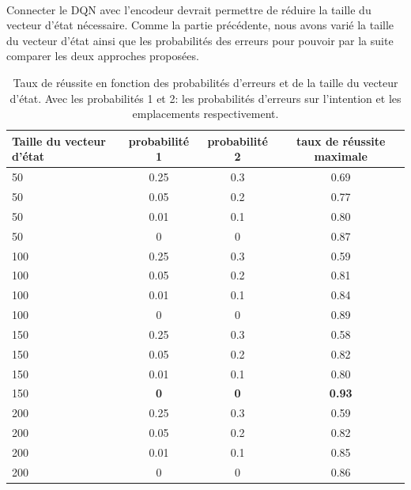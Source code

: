 \paragraph{}Connecter le DQN avec l'encodeur devrait permettre de réduire la taille du vecteur d'état nécessaire. Comme la partie précédente, nous avons varié la taille du vecteur d'état ainsi que les probabilités des erreurs pour pouvoir par la suite comparer les deux approches proposées. 
\begin{table}[H]
	\begin{center}
		
		\begin{tabular}{|l|c|c|c|}
			\hline
			\textbf{Taille du vecteur d'état} & \textbf{probabilité 1} & \textbf{probabilité 2} & \textbf{taux de réussite maximale}\\
			\hline
			50 & 0.25 & 0.3 & 0.69\\
			\hline
			50 & 0.05 & 0.2 & 0.77\\
			\hline
			50 & 0.01 & 0.1 & 0.80\\
			\hline
			50 & 0 & 0 & 0.87\\
			\hline
			100 & 0.25 & 0.3 & 0.59\\
			\hline
			100 & 0.05 & 0.2 & 0.81\\
			\hline
			100 & 0.01 & 0.1 & 0.84\\
			\hline
			100 & 0 & 0 & 0.89\\
			\hline
			150 & 0.25 & 0.3 & 0.58\\
			\hline
			150 & 0.05 & 0.2 & 0.82\\
			\hline
			150 & 0.01 & 0.1 & 0.80\\
			\hline
			150 & \textbf{0} & \textbf{0} & \textbf{0.93}\\
			\hline
			200 & 0.25 & 0.3 & 0.59\\
			\hline
			200 & 0.05 & 0.2 & 0.82\\
			\hline
			\rowcolor{LightCyan}
			200 & 0.01 & 0.1 & 0.85\\
			\hline
			200 & 0 & 0 & 0.86\\
			\hline
		\end{tabular}
		\caption{Taux de réussite en fonction des probabilités d'erreurs et de la taille du vecteur d'état. Avec les probabilités 1 et 2: les probabilités d'erreurs sur l'intention et les emplacements respectivement.}\label{table_results_con}
	\end{center}
\end{table}
